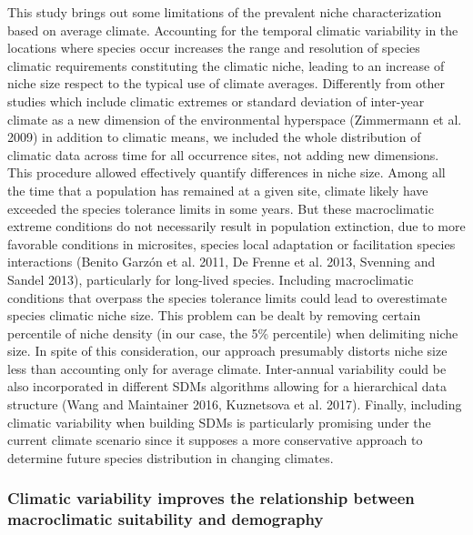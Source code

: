\documentclass[11pt,twoside]{reedthesis}
\begin{document}
This study brings out some limitations of the prevalent niche
characterization based on average climate. Accounting for the temporal
climatic variability in the locations where species occur increases the
range and resolution of species climatic requirements constituting the
climatic niche, leading to an increase of niche size respect to the
typical use of climate averages. Differently from other studies which
include climatic extremes or standard deviation of inter-year climate as
a new dimension of the environmental hyperspace (Zimmermann et al. 2009)
in addition to climatic means, we included the whole distribution of
climatic data across time for all occurrence sites, not adding new
dimensions. This procedure allowed effectively quantify differences in
niche size. Among all the time that a population has remained at a given
site, climate likely have exceeded the species tolerance limits in some
years. But these macroclimatic extreme conditions do not necessarily
result in population extinction, due to more favorable conditions in
microsites, species local adaptation or facilitation species
interactions (Benito Garzón et al. 2011, De Frenne et al. 2013, Svenning
and Sandel 2013), particularly for long-lived species. Including
macroclimatic conditions that overpass the species tolerance limits
could lead to overestimate species climatic niche size. This problem can
be dealt by removing certain percentile of niche density (in our case,
the 5\% percentile) when delimiting niche size. In spite of this
consideration, our approach presumably distorts niche size less than
accounting only for average climate. Inter-annual variability could be
also incorporated in different SDMs algorithms allowing for a
hierarchical data structure (Wang and Maintainer 2016, Kuznetsova et al.
2017). Finally, including climatic variability when building SDMs is
particularly promising under the current climate scenario since it
supposes a more conservative approach to determine future species
distribution in changing climates.\par

\subsubsection{Climatic variability improves the relationship between
macroclimatic suitability and
demography}\label{climatic-variability-improves-the-relationship-between-macroclimatic-suitability-and-demography}
\end{document}
